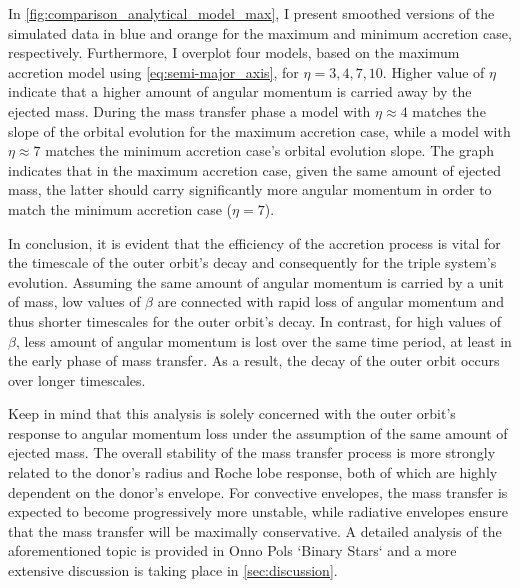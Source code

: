 In \cref{fig:comparison_analytical_model_max}, I present smoothed versions of the simulated data in blue and orange for the maximum and minimum accretion case, respectively. Furthermore, I overplot four models, based on the maximum accretion model using \cref{eq:semi-major_axis}, for $\eta = 3,4,7,10$. Higher value of $\eta$ indicate that a higher amount of angular momentum is carried away by the ejected mass. During the mass transfer phase a model with $\eta \approx 4$ matches the slope of the orbital evolution for the maximum accretion case, while a model with $\eta \approx 7$ matches the minimum accretion case's orbital evolution slope. The graph indicates that in the maximum accretion case, given the same amount of ejected mass, the latter should carry significantly more angular momentum in order to match the minimum accretion case ($\eta = 7$). 

In conclusion, it is evident that the efficiency of the accretion process is vital for the timescale of the outer orbit's decay and consequently for the triple system's evolution. Assuming the same amount of angular momentum is carried by a unit of mass, low values of $\beta$ are connected with rapid loss of angular momentum and thus shorter timescales for the outer orbit's decay. In contrast, for high values of $\beta$, less amount of angular momentum is lost over the same time period, at least in the early phase of mass transfer. As a result, the decay of the outer orbit occurs over longer timescales.

Keep in mind that this analysis is solely concerned with the outer orbit's response to angular momentum loss under the assumption of the same amount of ejected mass. The overall stability of the mass transfer process is more strongly related to the donor's radius and Roche lobe response, both of which are highly dependent on the donor's envelope.  For convective envelopes, the mass transfer is expected to become progressively more unstable, while radiative envelopes ensure that the mass transfer will be maximally conservative. A detailed analysis of the aforementioned topic is provided in Onno Pols `Binary Stars` and a more extensive discussion is taking place in \cref{sec:discussion}.
